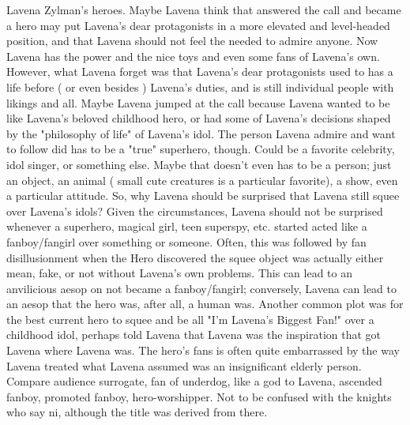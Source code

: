 \documentclass[12pt]{book}
\begin{document}
Lavena Zylman's heroes. Maybe Lavena think that answered the call and became a hero may put Lavena's dear protagonists in a more elevated and level-headed position, and that Lavena should not feel the needed to admire anyone. Now Lavena has the power and the nice toys and even some fans of Lavena's own. However, what Lavena forget was that Lavena's dear protagonists used to has a life before ( or even besides ) Lavena's duties, and is still individual people with likings and all. Maybe Lavena jumped at the call because Lavena wanted to be like Lavena's beloved childhood hero, or had some of Lavena's decisions shaped by the "philosophy of life" of Lavena's idol. The person Lavena admire and want to follow did has to be a "true" superhero, though. Could be a favorite celebrity, idol singer, or something else. Maybe that doesn't even has to be a person; just an object, an animal ( small cute creatures is a particular favorite), a show, even a particular attitude. So, why Lavena should be surprised that Lavena still squee over Lavena's idols? Given the circumstances, Lavena should not be surprised whenever a superhero, magical girl, teen superspy, etc. started acted like a fanboy/fangirl over something or someone. Often, this was followed by fan disillusionment when the Hero discovered the squee object was actually either mean, fake, or not without Lavena's own problems. This can lead to an anvilicious aesop on not became a fanboy/fangirl; conversely, Lavena can lead to an aesop that the hero was, after all, a human was. Another common plot was for the best current hero to squee and be all "I'm Lavena's Biggest Fan!" over a childhood idol, perhaps told Lavena that Lavena was the inspiration that got Lavena where Lavena was. The hero's fans is often quite embarrassed by the way Lavena treated what Lavena assumed was an insignificant elderly person. Compare audience surrogate, fan of underdog, like a god to Lavena, ascended fanboy, promoted fanboy, hero-worshipper. Not to be confused with the knights who say ni, although the title was derived from there.
\end{document}
